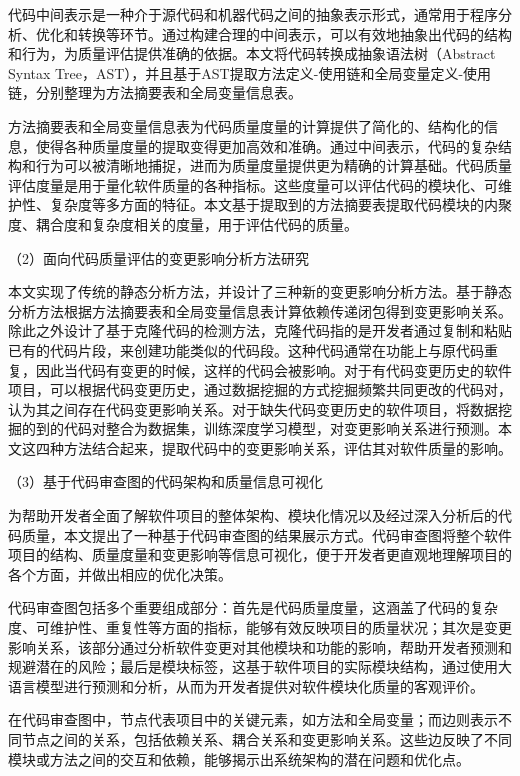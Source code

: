 代码中间表示是一种介于源代码和机器代码之间的抽象表示形式，通常用于程序分析、优化和转换等环节。通过构建合理的中间表示，可以有效地抽象出代码的结构和行为，为质量评估提供准确的依据。本文将代码转换成抽象语法树（Abstract Syntax Tree，AST），并且基于AST提取方法定义-使用链和全局变量定义-使用链，分别整理为方法摘要表和全局变量信息表。

方法摘要表和全局变量信息表为代码质量度量的计算提供了简化的、结构化的信息，使得各种质量度量的提取变得更加高效和准确。通过中间表示，代码的复杂结构和行为可以被清晰地捕捉，进而为质量度量提供更为精确的计算基础。代码质量评估度量是用于量化软件质量的各种指标。这些度量可以评估代码的模块化、可维护性、复杂度等多方面的特征。本文基于提取到的方法摘要表提取代码模块的内聚度、耦合度和复杂度相关的度量，用于评估代码的质量。

（2）面向代码质量评估的变更影响分析方法研究

本文实现了传统的静态分析方法，并设计了三种新的变更影响分析方法。基于静态分析方法根据方法摘要表和全局变量信息表计算依赖传递闭包得到变更影响关系。除此之外设计了基于克隆代码的检测方法，克隆代码指的是开发者通过复制和粘贴已有的代码片段，来创建功能类似的代码段。这种代码通常在功能上与原代码重复，因此当代码有变更的时候，这样的代码会被影响。对于有代码变更历史的软件项目，可以根据代码变更历史，通过数据挖掘的方式挖掘频繁共同更改的代码对，认为其之间存在代码变更影响关系。对于缺失代码变更历史的软件项目，将数据挖掘的到的代码对整合为数据集，训练深度学习模型，对变更影响关系进行预测。本文这四种方法结合起来，提取代码中的变更影响关系，评估其对软件质量的影响。



（3）基于代码审查图的代码架构和质量信息可视化

为帮助开发者全面了解软件项目的整体架构、模块化情况以及经过深入分析后的代码质量，本文提出了一种基于代码审查图的结果展示方式。代码审查图将整个软件项目的结构、质量度量和变更影响等信息可视化，便于开发者更直观地理解项目的各个方面，并做出相应的优化决策。

代码审查图包括多个重要组成部分：首先是代码质量度量，这涵盖了代码的复杂度、可维护性、重复性等方面的指标，能够有效反映项目的质量状况；其次是变更影响关系，该部分通过分析软件变更对其他模块和功能的影响，帮助开发者预测和规避潜在的风险；最后是模块标签，这基于软件项目的实际模块结构，通过使用大语言模型进行预测和分析，从而为开发者提供对软件模块化质量的客观评价。

在代码审查图中，节点代表项目中的关键元素，如方法和全局变量；而边则表示不同节点之间的关系，包括依赖关系、耦合关系和变更影响关系。这些边反映了不同模块或方法之间的交互和依赖，能够揭示出系统架构的潜在问题和优化点。

